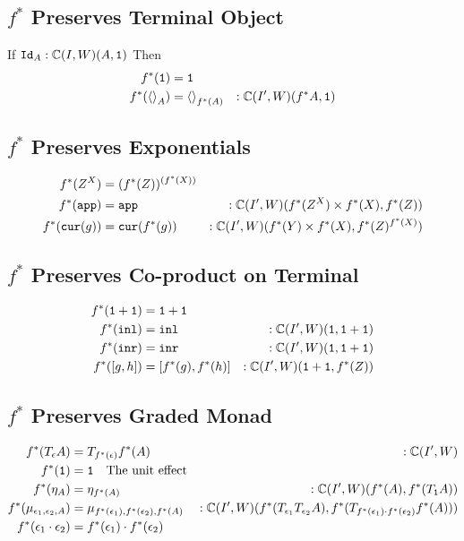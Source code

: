\documentclass{report}
\newcommand\ciw[0]{\C(I, W)}
\newcommand\cipw[0]{\C(I', W)}
\renewcommand\star[0]{^*}
\begin{document}
\subsection{$f\star$ Preserves Terminal Object}
If $\Id{A}:\ciw(A, \1)$
Then 
\begin{align}
    f\star(\1) & = \1 \\
    f\star(\term{A}) & = \term{f\star(A)}&:\cipw(f\star A, \1)\\
\end{align}

\subsection{$f\star$ Preserves Exponentials}
\begin{align}
    f\star(Z^X) & = (f\star(Z))^{(f\star(X))}\\
     f\star(\app) &= \app&:\cipw(f\star(Z^X)\times f\star(X), f\star(Z))\\
     f\star(\cur{g}) &= \cur{f\star(g)}&:\cipw(f\star(Y)\times f\star(X), f\star(Z)^{f\star(X)})
\end{align}

\subsection{$f\star$ Preserves Co-product on Terminal}

\begin{align}
    f\star(\1+\1) &= \1+\1\\
    f\star(\inl)  &= \inl&:\cipw(\1, \1+\1) \\
    f\star(\inr) &= \inr&:\cipw(\1, \1+\1) \\
    f\star([g, h]) &= [f\star(g), f\star(h)]&:\cipw(\1+\1, f\star(Z))
\end{align}

\subsection{$f\star$ Preserves Graded Monad}
\begin{align}
    f\star(\tea) &= \T{f\star(\e)}{f\star(A)}&:\cipw\\
    f\star(\1) &= \1 \qt{The unit effect}\\
    f\star(\point{A}) &= \point{f\star(A)}&:\cipw(f\star(A), f\star(\toa))\\
    f\star(\bind{\e_1}{\e_2}{A}) &= \bind{f\star(\e_1)}{f\star(\e_2)}{f\star(A)}&:\cipw(f\star(\T{\e_1}{\T{\e_2}{A}}), f\star(\T{f\star(\e_1)\dot f\star(\e_2)}{f\star(A)}))\\
    f\star(\e_1\dot\e_2) &= f\star(\e_1)\dot f\star(\e_2)\\
\end{align}
\end{document}
